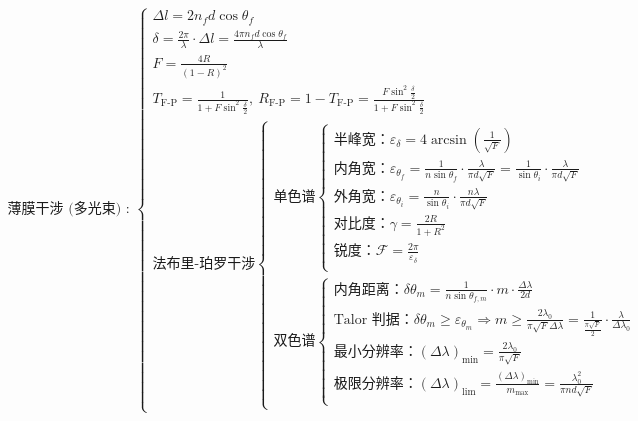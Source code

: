 \documentclass[UTF8]{report}
\theoremstyle{MyLineTheoremStyle} %
\theoremstyle{MyBlockTheoremStyle} %
\theoremstyle{MySubsubsectionStyle} %
\begin{document}
\begin{align*}
    \text{薄膜干涉 (多光束) : }
    \begin{cases}
        \Delta l = 2n_fd \cos \theta_f \\
        \delta = \frac{2\pi}{\lambda} \cdot \Delta l = \frac{4 \pi n_f d \cos \theta_f}{\lambda} \\
        F = \frac{4R}{(1 - R)^2} \\
        T_{\text{F-P}} = \frac{1}{1 + F \sin^2 \frac{\delta}{2}},\ R_{\text{F-P}} = 1 - T_{\text{F-P}} = \frac{F \sin^2 \frac{\delta}{2}}{1 + F \sin^2 \frac{\delta}{2}}\\
        \text{法布里-珀罗干涉}
            \begin{cases}
                \text{单色谱}
                    \begin{cases}
                        \text{半峰宽：}\varepsilon_{\delta} = 4 \arcsin \left(\frac{1}{\sqrt{F} }\right) \\
                        \text{内角宽：} \varepsilon_{\theta_f} = \frac{1}{n \sin \theta_f} \cdot \frac{\lambda}{\pi d \sqrt{F}} = \frac{1}{\sin \theta_i} \cdot \frac{\lambda}{\pi d \sqrt{F}} \\
                        \text{外角宽：} \varepsilon_{\theta_i} = \frac{n}{\sin \theta_i} \cdot \frac{n \lambda}{\pi d \sqrt{F}} \\
                        \text{对比度：} \gamma = \frac{2R}{1 + R^2} \\
                        \text{锐度：} \mathscr{F} = \frac{2\pi}{\varepsilon_{\delta}} \\
                    \end{cases} \\ 
                \text{双色谱}
                    \begin{cases}
                        \text{内角距离：} \delta \theta_m = \frac{1}{n \sin \theta_{f,m}} \cdot m \cdot \frac{\Delta \lambda}{2d} \\ 
                        \text{Talor 判据：} \delta \theta_m \geq \varepsilon_{\theta_m} \Longrightarrow m \geq \frac{2\lambda_0}{\pi \sqrt{F} \Delta \lambda} = \frac{1}{\frac{\pi \sqrt{F}}{2}}\cdot \frac{\lambda}{\Delta \lambda_0}\\
                        \text{最小分辨率：}\left(\Delta \lambda\right)_{\min} = \frac{2\lambda_0}{\pi \sqrt{F}} \\ 
                        \text{极限分辨率：}\left(\Delta \lambda\right)_{\lim} = \frac{\left(\Delta \lambda\right)_{\min}}{m_{\max}} = \frac{\lambda_0^2}{\pi n d \sqrt{F}} \\ 

\end{cases}
\end{cases}
\end{cases}
\end{align*}
\end{document}
